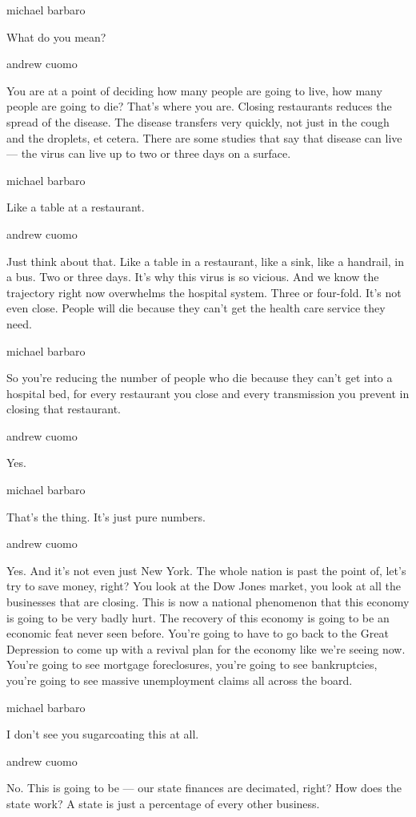 michael barbaro

What do you mean?

andrew cuomo

You are at a point of deciding how many people are going to live, how
many people are going to die? That's where you are. Closing restaurants
reduces the spread of the disease. The disease transfers very quickly,
not just in the cough and the droplets, et cetera. There are some
studies that say that disease can live --- the virus can live up to two
or three days on a surface.

michael barbaro

Like a table at a restaurant.

andrew cuomo

Just think about that. Like a table in a restaurant, like a sink, like a
handrail, in a bus. Two or three days. It's why this virus is so
vicious. And we know the trajectory right now overwhelms the hospital
system. Three or four-fold. It's not even close. People will die because
they can't get the health care service they need.

michael barbaro

So you're reducing the number of people who die because they can't get
into a hospital bed, for every restaurant you close and every
transmission you prevent in closing that restaurant.

andrew cuomo

Yes.

michael barbaro

That's the thing. It's just pure numbers.

andrew cuomo

Yes. And it's not even just New York. The whole nation is past the point
of, let's try to save money, right? You look at the Dow Jones market,
you look at all the businesses that are closing. This is now a national
phenomenon that this economy is going to be very badly hurt. The
recovery of this economy is going to be an economic feat never seen
before. You're going to have to go back to the Great Depression to come
up with a revival plan for the economy like we're seeing now. You're
going to see mortgage foreclosures, you're going to see bankruptcies,
you're going to see massive unemployment claims all across the board.

michael barbaro

I don't see you sugarcoating this at all.

andrew cuomo

No. This is going to be --- our state finances are decimated, right? How
does the state work? A state is just a percentage of every other
business.

